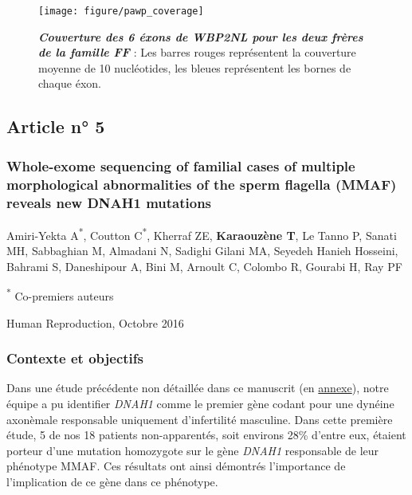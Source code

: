 \documentclass[12pt,twoside]{ugathesis}
\begin{document}
\begin{figure}

{\centering \texttt{[image: figure/pawp\_coverage]} 

}

\caption[Couverture des 6 éxons de WBP2NL pour les deux frères de la famille FF]{\textbf{\emph{Couverture des 6 éxons de \emph{WBP2NL}
pour les deux frères de la famille FF}} : Les barres rouges représentent
la couverture moyenne de 10 nucléotides, les bleues représentent les
bornes de chaque éxon.}\label{fig:plotcovplcz}
\end{figure}






\newpage

\subsection{Article n° 5}\label{article-n-5}

\subsubsection{Whole-exome sequencing of familial cases of multiple
morphological abnormalities of the sperm flagella (MMAF) reveals new
DNAH1
mutations}\label{whole-exome-sequencing-of-familial-cases-of-multiple-morphological-abnormalities-of-the-sperm-flagella-mmaf-reveals-new-dnah1-mutations}

Amiri-Yekta A\textsuperscript{*}, Coutton C\textsuperscript{*}, Kherraf
ZE, \textbf{Karaouzène T}, Le Tanno P, Sanati MH, Sabbaghian M, Almadani
N, Sadighi Gilani MA, Seyedeh Hanieh Hosseini, Bahrami S, Daneshipour A,
Bini M, Arnoult C, Colombo R, Gourabi H, Ray PF

\textsuperscript{*} Co-premiers auteurs

Human Reproduction, Octobre 2016

\newpage

\subsubsection{Contexte et objectifs}\label{contexte-et-objectifs-2}

Dans une étude précédente non détaillée dans ce manuscrit (en
\protect\hyperlink{dnah12014}{annexe}), notre équipe a pu identifier
\emph{DNAH1} comme le premier gène codant pour une dynéine axonèmale
responsable uniquement d'infertilité masculine. Dans cette première
étude, 5 de nos 18 patients non-apparentés, soit environs 28\% d'entre
eux, étaient porteur d'une mutation homozygote sur le gène \emph{DNAH1}
responsable de leur phénotype MMAF. Ces résultats ont ainsi démontrés
l'importance de l'implication de ce gène dans ce phénotype.
\end{document}
